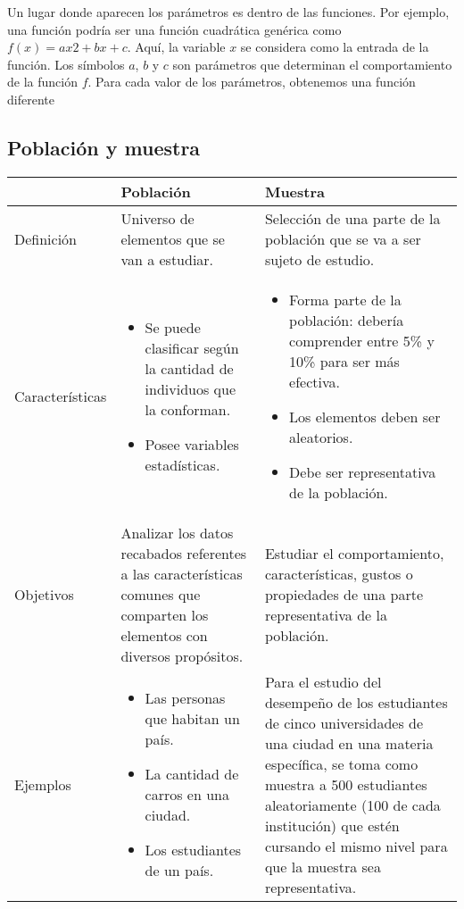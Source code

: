 Un lugar donde aparecen los parámetros es dentro de las funciones. Por ejemplo,
una función podría ser una función cuadrática genérica como $f(x)=ax2+bx+c$.
Aquí, la variable $x$ se considera como la entrada de la función. Los símbolos
$a$, $b$ y $c$ son parámetros que determinan el comportamiento de la función $f$.
Para cada valor de los parámetros, obtenemos una función diferente

\subsection{Población y muestra}

\begin{tabular}{l|p{6cm}|p{6cm}}
                & \textbf{Población}    &   \textbf{Muestra}    \\
\hline

Definición  & 	Universo de elementos que se van a estudiar.    &   Selección de
una parte de la población que se va a ser sujeto de estudio.   \\

\hline

Características &   

\begin{itemize} 
    \item Se puede clasificar según la cantidad de individuos que la conforman. 
    \item Posee variables estadísticas. 
\end{itemize}
& \begin{itemize}
    \item Forma parte de la población: debería comprender entre 5\% y 10\% para ser más
efectiva. 
    \item Los elementos deben ser aleatorios. 
    \item Debe ser representativa de la población.
\end{itemize} \\
\hline

    Objetivos & Analizar los datos recabados referentes a las características comunes que
comparten los elementos con diversos propósitos. & Estudiar el comportamiento,
características, gustos o propiedades de una parte representativa de la
población. \\

\hline

Ejemplos & \begin{itemize} \item Las personas que habitan un país.
\item La cantidad de carros en una ciudad.
\item Los estudiantes de un país.
\end{itemize} & Para el estudio del desempeño de los estudiantes de cinco
universidades de una ciudad en una materia específica, se toma como muestra a
500 estudiantes aleatoriamente (100 de cada institución) que estén cursando el
mismo nivel para que la muestra sea representativa.

\end{tabular}


